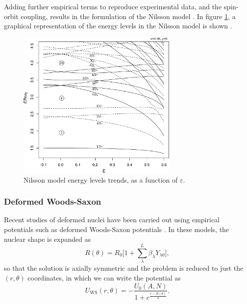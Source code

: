 Adding further empirical terms to reproduce experimental data, and the spin-orbit coupling, results in the formulation of the Nilsson model \cite{nilsson}. In figure \ref{fig:nilsson}, a graphical representation of the energy levels in the Nilsson model is shown \cite{wikipedia_equation_of_state}.
\begin{figure}[H]
    \centering
    \includegraphics[width=0.7\textwidth]{Images/nilsson.pdf}
    \caption{Nilsson model energy levels trends, as a function of $\varepsilon$.}
    \label{fig:nilsson}
\end{figure}
\subsubsection{Deformed Woods-Saxon}
Recent studies of deformed nuclei have been carried out using empirical potentials such as deformed Woods-Saxon potentials \cite{def_WS_dudek,defWSfissionbarriers}. In these models, the nuclear shape is expanded as 
\begin{equation}
R(\theta) = R_0\bigg[1+\sum_{\lambda}^L \beta_{\lambda}Y_{\lambda 0}\bigg],
\end{equation}
so that the solution is axially symmetric and the problem is reduced to just the $(r, \theta)$ coordinates, in which we can write the potential as
\begin{equation}
    \label{eq:def_WS}
    U_\text{WS}(r, \theta) = -\frac{U_0(A, N)}{1+e^\frac{r - R(\theta)}{a}}.
\end{equation}

